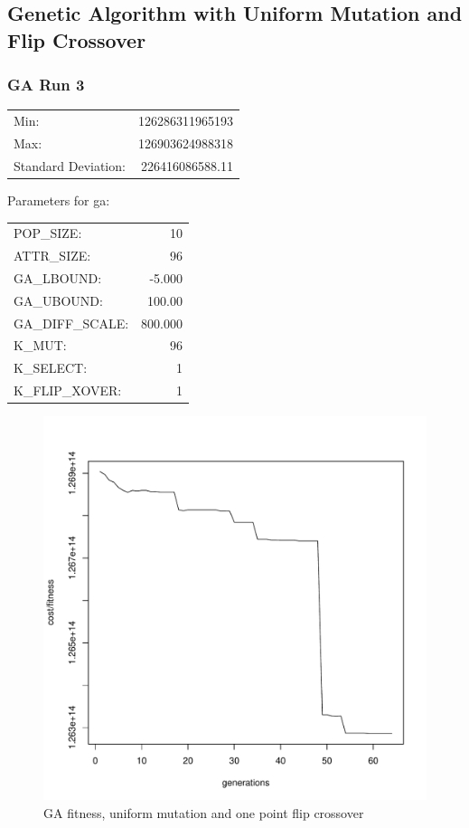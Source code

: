 \pagebreak
\subsection{Genetic Algorithm with Uniform Mutation and Flip Crossover}
\subsubsection{GA Run 3}
\begin{tabular}{lr}
	Min: 			& 126286311965193 \\
	Max:			& 126903624988318 \\
	Standard Deviation:	& 226416086588.11 \\
\end{tabular}

Parameters for ga:\\
\begin{tabular}{lr}
	POP\_SIZE:	& 10 \\
	ATTR\_SIZE:	& 96 \\
	GA\_LBOUND:	& -5.000 \\
	GA\_UBOUND:	& 100.00 \\
	GA\_DIFF\_SCALE: & 800.000 \\
	K\_MUT:		& 96 \\
	K\_SELECT:	& 1 \\
	K\_FLIP\_XOVER:	& 1 \\
\end{tabular}

\begin{figure}[!h]
	\begin{center}
		\includegraphics[width=120mm]{output/ga03/graph.pdf}
               	\caption{GA fitness, uniform mutation and one point flip crossover}
                \label{saXX_exc}
        \end{center}
\end{figure}

